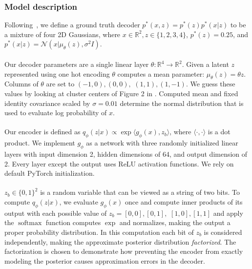 \subsubsection{Model description}

Following~\cite{shekhovtsov2022vae}, we define a ground truth decoder $p^*(x, z) = p^*(z)p^*(x|z)$ to be a mixture of four 2D Gaussians, where $x \in \mathbb{R}^2, z\in\{1, 2, 3, 4\}$, $p^*(z) = 0.25$, and $p^*(x|z) = \mathcal{N}(x|\mu_\theta(z), \sigma^2I)$.

\paragraph{} Our decoder parameters are a single linear layer $\theta: \mathbb{R}^{4} \to \mathbb{R}^{2}$. Given a latent $z$ represented using one hot encoding $\theta$ computes a mean parameter: $\mu_\theta(z) = \theta{}z$.  Columns of $\theta$ are set to $(-1,0), (0,0),$ $(1,1), (1,-1)$. We guess these values by looking at cluster centers of Figure 2 in \cite{shekhovtsov2022vae}. Computed mean and fixed identity covariance scaled by $\sigma = 0.01$ determine the normal distribution that is used to evaluate log probability of $x$.

\paragraph{} Our encoder is defined as $q_\phi(z|x) \propto \exp \langle g_\phi(x), z_b \rangle$, where $\langle \cdot, \cdot \rangle$ is a dot product. We implement $g_\phi$ as a network with three randomly initialized linear layers with input dimension 2, hidden dimensions of 64, and output dimension of 2. Every layer except the output uses ReLU activation functions. We rely on default PyTorch initialization.

\paragraph{} $z_b \in \{0, 1\}^2$ is a random variable that can be viewed as a string of two bits. To compute $q_\phi(z|x)$, we evaluate $g_\phi(x)$ once and compute inner products of its output with each possible value of $z_b = [0, 0], [0, 1],$ $[1, 0], [1, 1]$ and apply the $\operatorname{softmax}$ function computes $\exp$ and normalizes, making the output a proper probability distribution. In this computation each bit of $z_b$ is considered independently, making the approximate posterior distribution \textit{factorized}. The factorization is chosen to demonstrate how preventing the encoder from exactly modeling the posterior causes approximation errors in the decoder.


